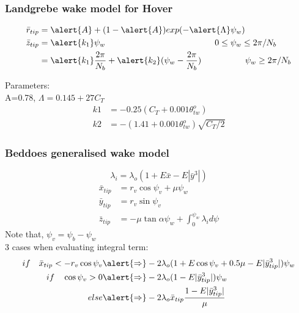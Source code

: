\documentclass[11pt]{beamer}
\begin{document}
\begin{frame}[t]
\frametitle{Landgrebe wake model for Hover}
\begin{align}
	\bar{r}_{tip} &=\alert{A}+(1-\alert{A})exp(-\alert{\Lambda} \psi_w)\\
	\bar{z}_{tip} &=\alert{k_1}\psi_w \hspace{4.5cm} 0\le\psi_w\le 2\pi/N_b\\
	       &=\alert{k_1}\frac{2\pi}{N_b}+\alert{k_2}(\psi_w-\frac{2\pi}{N_b}) \hspace{1.8cm} \psi_w\ge 2\pi/N_b
\end{align}

\vspace{0.5cm}
Parameters:\\
A=0.78, $\Lambda=0.145+27C_T$
\begin{align*}
	k1 &= -0.25(C_T+0.001\theta_{tw}^o)\\
    k2 &= -(1.41+0.001\theta_{tw}^o)\sqrt{C_T/2}
\end{align*}
\end{frame}

\begin{frame}[t]
\frametitle{Beddoes generalised wake model}
	\begin{equation}
		\lambda_i=\lambda_o(1+E\bar{x}-E|\bar{y}^3|)
	\end{equation}
	\begin{align}
		\bar{x}_{tip}&=r_v\cos\psi_v+\mu\psi_w\\
		\bar{y}_{tip}&=r_v\sin\psi_v\\
		\bar{z}_{tip}&=-\mu\tan\alpha\psi_w+\int_{0}^{\psi_w}\lambda_id\psi
	\end{align}
	{\small Note that, $\psi_v=\psi_b-\psi_w$}\\
	3 cases when evaluating integral term:\\
	\vspace{-0.5cm}
\begin{align*}
if \quad \bar{x}_{tip}<-r_v\cos\psi_v&\alert{\Rightarrow}-2\lambda_o(1+E\cos\psi_v+0.5\mu-E|\bar{y}_{tip}^3|)\psi_w\\
if \quad \cos\psi_v>0&\alert{\Rightarrow}-2\lambda_o(1-E|\bar{y}_{tip}^3|)\psi_w\\
else &\alert{\Rightarrow}-2\lambda_o\bar{x}_{tip}\frac{1-E|\bar{y}_{tip}^3|}{\mu}
\end{align*}
\end{frame}
\end{document}

